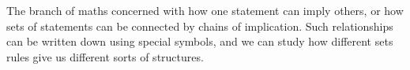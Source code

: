 The branch of maths concerned with how one statement
can imply others, or how sets of statements can be
connected by chains of implication. Such relationships
can be written down using special symbols, and we can
study how different sets rules give us different
sorts of structures.